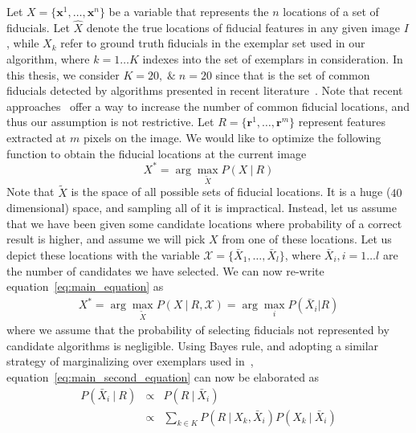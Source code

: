 \label{subsec:formulation}
Let $X = \{ \mathbf{x}^1, \ldots, \mathbf{x}^n \}$ be a variable that represents the $n$ locations of 
a set of fiducials.
Let $\hat{X}$ denote the true locations of fiducial features in any given image $I$, while $X_k$ refer
to ground truth fiducials in the exemplar set used in our algorithm, where $k = 1 \ldots K $ indexes
into the set of exemplars in consideration. In this thesis, we consider $K = 20, \; \& \; n = 20$
since that is the set of common fiducials detected by algorithms presented in recent
literature~\cite{xhuCVPR12_wild,xiongCVPR13_SDM,artizzzuICCV13_COFW,asthanaCVPR14_Chehra,Tzimiropoulos_2015_CVPR}. Note that
recent approaches~\cite{smithECCV14_ED} offer a way to increase the number of common fiducial
locations, and thus our assumption is not restrictive.
Let $R = \{ \mathbf{r}^1, \ldots, \mathbf{r}^m \}$ represent features extracted at $m$ pixels on the
image. We would like to optimize the following function to obtain the fiducial locations at the
current image 
\begin{equation}
  X^* = \arg\max_{\tilde{X}} P( X~|~R )
  \label{eq:main_equation}
\end{equation}
Note that $\tilde{X}$ is the space of all possible sets of fiducial locations. It is a huge
($40$ dimensional) space, and sampling all of it is impractical. Instead, let us assume that we have
been given some candidate locations where probability of a correct result is higher, and assume we
will pick $X$ from one of these locations. Let us depict
these locations with the variable $\mathcal{X} = \{\bar{X}_1, \ldots, \bar{X}_l \}$, where $\bar{X}_i,
i = 1\ldots l$ are the number of candidates we have selected. We can now re-write equation~\ref{eq:main_equation} as
\begin{eqnarray}
  X^* = \arg\max_{\tilde{X}} P( X~|~R, \mathcal{X} )  = \arg\max_i P(\bar{X}_i | R ) 
  \label{eq:main_second_equation}
\end{eqnarray}
where we assume that the probability of selecting fiducials not represented by candidate algorithms
is negligible. Using Bayes rule, and adopting a similar strategy of marginalizing over exemplars used
in~\cite{kumarPAMI13_faceExem}, equation~\ref{eq:main_second_equation} can now be
elaborated as
\begin{eqnarray}
  P( \bar{X}_i~|~R ) & \propto & P( R~|~\bar{X}_i ) \\
  & \propto & \sum_{k\in K} P( R~|~X_k, \bar{X}_i) P( X_k~|~\bar{X}_i )
  \label{eq:main_third_equation}
\end{eqnarray}
